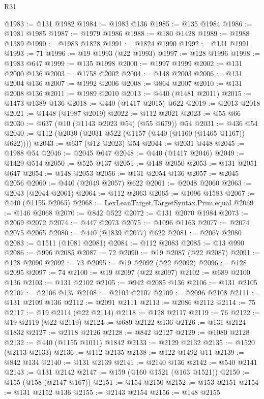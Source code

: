 \begin{lexlean}{R31}
\begin{coremodule}
@1983 := @131 @1982
@1984 := @1983 @136
@1985 := @135 @1984
@1986 := @1981 @1985
@1987 := @1979 @1986
@1988 := @180 @1428
@1989 := @1988 @1389
@1990 := @1983 @1828
@1991 := @1824 @1990
@1992 := @131 @1991
@1993 := 71
@1996 := @19 @1993 (@22 @1993)
@1997 := @128 @1996
@1998 := @1983 @647
@1999 := @135 @1998
@2000 := @1997 @1999
@2002 := @131 @2000 @136
@2003 := @1758 @2002
@2004 := @148 @2003
@2006 := @131 @2004 @136
@2007 := @1992 @2006
@2008 := @864 @2007
@2010 := @131 @2008 @136
@2011 := @1989 @2010
@2013 := @440 (@1481 @2011)
@2015 := @1473 @1389 @136
@2018 := @440 (@1417 @2015) @622
@2019 := @2013 @2018
@2021 := @1448 (@1987 @2019)
@2022 := @112 @2021
@2023 := @55 @66
@2030 := @637 (@10 (@1143 @2023 @54) (@55 @679)) @54
@2031 := @436 @54
@2040 := @112 (@2030 (@2031 @522 (@1157 (@440 (@1160 (@1465 @1167)) @622))))
@2043 := @637 (@12 @2023) @54
@2044 := @2031 @448
@2045 := @1988 @54
@2046 := @2045 @647
@2048 := @440 (@1417 @2046)
@2049 := @1429 @514
@2050 := @525 @137
@2051 := @148 @2050
@2053 := @131 @2051 @647
@2054 := @148 @2053
@2056 := @131 @2054 @136
@2057 := @2045 @2056
@2060 := @440 (@2049 @2057) @622
@2061 := @2048 @2060
@2063 := @2043 (@2044 @2061)
@2064 := @112 @2063
@2065 := @1096 @1583
@2067 := @440 (@1155 @2065)
@2068 := LexLeanTarget.TargetSyntax.Prim.equal
@2069 := @146 @2068
@2070 := @842 @522
@2072 := @131 @2070 @1984
@2073 := @2069 @2072
@2074 := @447 @2073
@2075 := @1096 @1163
@2077 := @2074 @2075 @2065
@2080 := @440 (@1839 @2077) @622
@2081 := @2067 @2080
@2083 := @1511 (@1081 @2081)
@2084 := @112 @2083
@2085 := @13 @990
@2086 := @996 @2085
@2087 := 72
@2090 := @19 @2087 (@22 @2087)
@2091 := @128 @2090
@2092 := 73
@2095 := @19 @2092 (@22 @2092)
@2096 := @128 @2095
@2097 := 74
@2100 := @19 @2097 (@22 @2097)
@2102 := @689 @2100 @136
@2103 := @131 @2102
@2105 := @942 @2085 @136
@2106 := @131 @2105
@2107 := @2106 @137
@2108 := @2103 @2107
@2109 := @2096 @2108
@2111 := @131 @2109 @136
@2112 := @2091 @2111
@2113 := @2086 @2112
@2114 := 75
@2117 := @19 @2114 (@22 @2114)
@2118 := @128 @2117
@2119 := 76
@2122 := @19 @2119 (@22 @2119)
@2124 := @689 @2122 @136
@2126 := @131 @2124 @1832
@2127 := @2118 @2126
@2128 := @842 @2127
@2129 := @1080 @2128
@2132 := @440 (@1155 @1011) @1842
@2133 := @2129 @2132
@2135 := @1520 (@2113 @2133)
@2136 := @112 @2135
@2138 := @122 @1492 @11
@2139 := @842 @134
@2140 := @131 @2139
@2141 := @2140 @136
@2142 := @540 @2141
@2143 := @131 @2142
@2147 := @159 (@160 @1521 (@163 @1521))
@2150 := @155 (@158 (@2147 @167))
@2151 := @154 @2150
@2152 := @153 @2151
@2154 := @131 @2152 @136
@2155 := @2143 @2154
@2156 := @148 @2155

\end{coremodule}
\end{lexlean}
